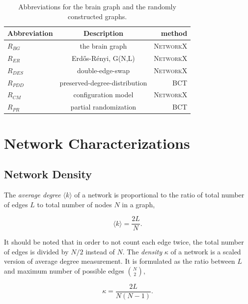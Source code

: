 \begin{table}[h]
\begin{center}
\caption[Abbreviations]{Abbreviations for the brain graph and the randomly constructed graphs. }
\begin{tabular}{ l | c | r }
  Abbreviation & Description & method \\
  \hline  \hline                     
  $R_{BG}$ & the brain graph						  & \textsc{NetworkX} \\ \hline
  $R_{ER}$ & Erd\H{o}s-R\'{e}nyi, G(N,L)            & \textsc{NetworkX} \\ \hline
  $R_{DES}$ & double-edge-swap            			  & \textsc{NetworkX} \\ \hline
  $R_{PDD}$ & preserved-degree-distribution		  & \textsc{BCT} 	 \\ \hline  
  $R_{CM}$ & configuration model       			  & \textsc{NetworkX} \\ \hline
  $R_{PR}$ & partial randomization            	  & \textsc{BCT} 	 \\ \hline  
  \hline  
\end{tabular}
\label{table:Abbreviations}
\end{center}
\end{table}	

\section{Network Characterizations}

\subsection{Network Density}
The \textit{average degree} $\langle k \rangle$ of a network is proportional to the ratio of total number of edges $L$ to total number of nodes $N$ in a graph, 

\begin{equation}
\langle k \rangle = \frac{2L}{N}.
\end{equation}

It should be noted that in order to not count each edge twice, the total number of edges is divided by $N/2$ instead of $N$. The \textit{density} $\kappa$ of a network is a scaled version of average degree measurement. It is formulated as the ratio between $L$ and maximum number of possible edges $\binom{N}{2}$,

\begin{equation}
\kappa = \frac{2L}{N(N-1)}.
\end{equation}	

